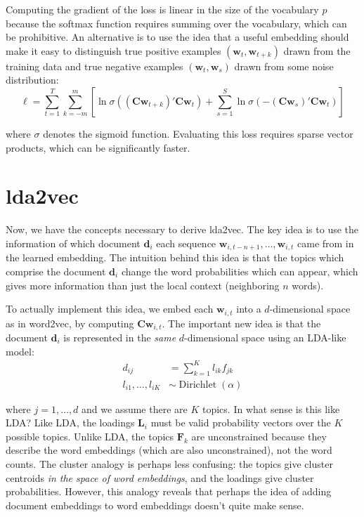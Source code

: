 \documentclass{amsart}
\DeclareMathOperator\Dir{Dirichlet}
\newcommand\vd{\symbf{d}}
\newcommand\vw{\symbf{w}}
\newcommand\mc{\symbf{C}}
\newcommand\ml{\symbf{L}}
\newcommand\mf{\symbf{F}}
\begin{document}
Computing the gradient of the loss is linear in the size of the vocabulary
\(p\) because the softmax function requires summing over the vocabulary, which
can be prohibitive. An alternative is to use the idea that a useful embedding
should make it easy to distinguish true positive examples \((\vw_t,
\vw_{t+k})\) drawn from the training data and true negative examples \((\vw_t,
\vw_s)\) drawn from some noise distribution:
%
\begin{equation}
  \ell = \sum_{t=1}^T \sum_{k=-m}^m \left[ \ln\sigma((\mc\vw_{t+k})'\mc\vw_t) +
  \sum_{s=1}^S \ln\sigma(-(\mc\vw_s)'\mc\vw_t) \right]
\end{equation}

where \(\sigma\) denotes the sigmoid function. Evaluating this loss requires
sparse vector products, which can be significantly faster.

\section{lda2vec}

Now, we have the concepts necessary to derive lda2vec. The key idea is to use
the information of which document \(\vd_i\) each sequence \(\vw_{i,t-n+1},
\ldots, \vw_{i,t}\) came from in the learned embedding. The intuition behind
this idea is that the topics which comprise the document \(\vd_i\) change the
word probabilities which can appear, which gives more information than just the
local context (neighboring \(n\) words).

To actually implement this idea, we embed each \(\vw_{i,t}\) into a
\(d\)-dimensional space as in word2vec, by computing \(\mc \vw_{i,t}\). The
important new idea is that the document \(\vd_i\) is represented in the
\emph{same} \(d\)-dimensional space using an LDA-like model:
%
\begin{align}
  d_{ij} &= \sum_{k=1}^K l_{ik} f_{jk}\\
  l_{i1}, \ldots, l_{iK} &\sim \Dir(\alpha)
\end{align}

where \(j = 1, \ldots, d\) and we assume there are \(K\) topics. In what sense
is this like LDA? Like LDA, the loadings \(\ml_i\) must be valid probability
vectors over the \(K\) possible topics. Unlike LDA, the topics \(\mf_k\) are
unconstrained because they describe the word embeddings (which are also
unconstrained), not the word counts. The cluster analogy is perhaps less
confusing: the topics give cluster centroids \emph{in the space of word
  embeddings}, and the loadings give cluster probabilities. However, this
analogy reveals that perhaps the idea of adding document embeddings to word
embeddings doesn't quite make sense.
\end{document}
